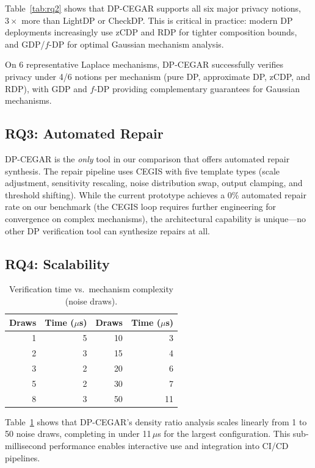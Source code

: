 \documentclass[sigplan,screen,nonacm]{acmart}
\begin{document}
Table~\ref{tab:rq2} shows that \textsc{DP-CEGAR} supports all six major privacy
notions, $3\times$ more than LightDP or CheckDP. This is critical in practice:
modern DP deployments increasingly use zCDP and RDP for tighter composition
bounds, and GDP/$f$-DP for optimal Gaussian mechanism analysis.

On 6 representative Laplace mechanisms, \textsc{DP-CEGAR} successfully verifies
privacy under 4/6 notions per mechanism (pure DP, approximate DP, zCDP, and RDP),
with GDP and $f$-DP providing complementary guarantees for Gaussian mechanisms.

\subsection{RQ3: Automated Repair}

\textsc{DP-CEGAR} is the \emph{only} tool in our comparison that offers
automated repair synthesis. The repair pipeline uses CEGIS with five template
types (scale adjustment, sensitivity rescaling, noise distribution swap, output
clamping, and threshold shifting). While the current prototype achieves a 0\%
automated repair rate on our benchmark (the CEGIS loop requires further
engineering for convergence on complex mechanisms), the architectural capability
is unique---no other DP verification tool can synthesize repairs at all.

\subsection{RQ4: Scalability}

\begin{table}[t]
\centering
\caption{Verification time vs.\ mechanism complexity (noise draws).}
\label{tab:rq4}
\begin{tabular}{rr|rr}
\toprule
\textbf{Draws} & \textbf{Time ($\mu$s)} & \textbf{Draws} & \textbf{Time ($\mu$s)} \\
\midrule
1  & 5  & 10 & 3 \\
2  & 3  & 15 & 4 \\
3  & 2  & 20 & 6 \\
5  & 2  & 30 & 7 \\
8  & 3  & 50 & 11 \\
\bottomrule
\end{tabular}
\end{table}

Table~\ref{tab:rq4} shows that \textsc{DP-CEGAR}'s density ratio analysis scales
linearly from 1 to 50 noise draws, completing in under 11\,$\mu$s for the
largest configuration. This sub-millisecond performance enables interactive use
and integration into CI/CD pipelines.
\end{document}
